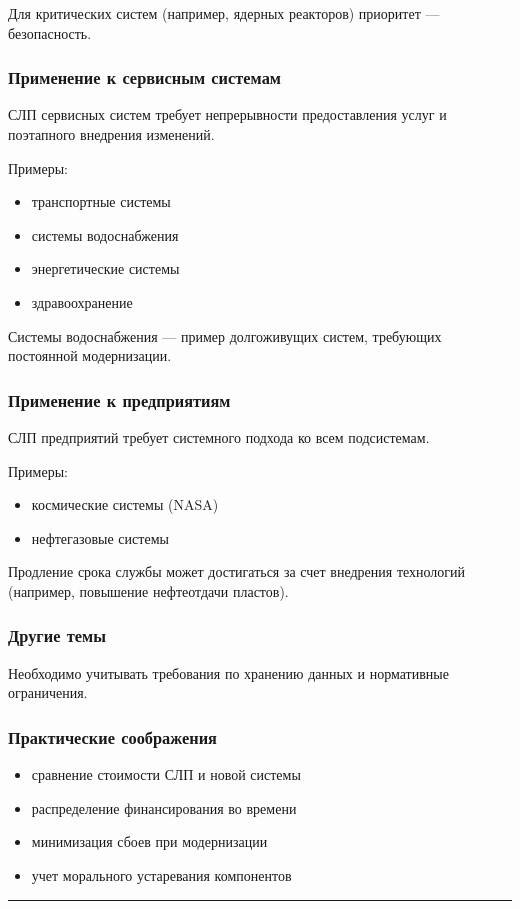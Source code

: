 \documentclass[14pt,a4paper]{extarticle}
\begin{document}
Для критических систем (например, ядерных реакторов) приоритет — безопасность.

\subsubsection{Применение к сервисным системам}

СЛП сервисных систем требует непрерывности предоставления услуг и поэтапного внедрения изменений.

Примеры:

\begin{itemize}
\item транспортные системы
\item системы водоснабжения
\item энергетические системы
\item здравоохранение
\end{itemize}

Системы водоснабжения — пример долгоживущих систем, требующих постоянной модернизации.

\subsubsection{Применение к предприятиям}

СЛП предприятий требует системного подхода ко всем подсистемам.

Примеры:

\begin{itemize}
\item космические системы (NASA)
\item нефтегазовые системы
\end{itemize}

Продление срока службы может достигаться за счет внедрения технологий (например, повышение нефтеотдачи пластов).

\subsubsection{Другие темы}

Необходимо учитывать требования по хранению данных и нормативные ограничения.

\subsubsection{Практические соображения}

\begin{itemize}
\item сравнение стоимости СЛП и новой системы
\item распределение финансирования во времени
\item минимизация сбоев при модернизации
\item учет морального устаревания компонентов
\end{itemize}
\hrule
\end{document}
